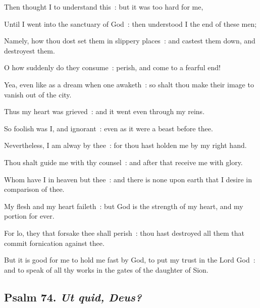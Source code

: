 Then thought I to understand this~: but it was too hard for me,\par
{}Until I went into the sanctuary of God~: then understood I the end of these men;\par
{}Namely, how thou dost set them in slippery places~: and castest them down, and destroyest them.\par
{}O how suddenly do they consume~: perish, and come to a fearful end!\par
{}Yea, even like as a dream when one awaketh~: so shalt thou make their image to vanish out of the city.\par
{}Thus my heart was grieved~: and it went even through my reins.\par
{}So foolish was I, and ignorant~: even as it were a beast before thee.\par
{}Nevertheless, I am alway by thee~: for thou hast holden me by my right hand.\par
{}Thou shalt guide me with thy counsel~: and after that receive me with glory.\par
{}Whom have I in heaven but thee~: and there is none upon earth that I desire in comparison of thee.\par
{}My flesh and my heart faileth~: but God is the strength of my heart, and my portion for ever.\par
{}For lo, they that forsake thee shall perish~: thou hast destroyed all them that commit fornication against thee.\par
{}But it is good for me to hold me fast by God, to put my trust in the Lord God~: and to speak of all thy works in the gates of the daughter of Sion.\par

\subsection{Psalm 74. \textit{Ut quid, Deus?}}


